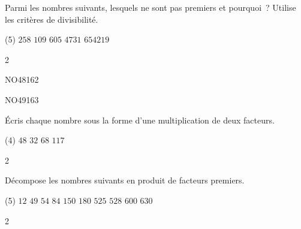 \documentclass[a4paper,12pt]{report}
\begin{document}
\begin{exo}{ %
    Parmi les nombres suivants, lesquels ne sont pas premiers et pourquoi~? Utilise les critères de divisibilité.
    \begin{tasks}[label-width = 1em ,item-indent = 2em ,before-skip = -0.4em, after-skip = -0.4em , label-offset=0.666em,after-item-skip = 0.3em](5)
    \task $258$
    \task $109$
    \task $605$
    \task $4731$
    \task $654219$
\end{tasks}
}{2}\end{exo}







\begin{exof}{NO48}{16}{2}
\end{exof}
\begin{exof}{NO49}{16}{3}
\end{exof}


\begin{exo}{ %
    Écris chaque nombre sous la forme d'une multiplication de deux facteurs.
    \begin{tasks}[label-width = 1em ,item-indent = 2em ,before-skip = -0.4em, after-skip = -0.4em , label-offset=0.666em,after-item-skip = 0.3em](4)
    \task $48$
    \task $32$
    \task $68$
    \task $117$
\end{tasks}
}{2}\end{exo}








\begin{exo}{
    Décompose les nombres suivants en produit de facteurs premiers.
    \begin{tasks}[label-width = 1em ,item-indent = 2em ,before-skip = -0.4em, after-skip = -0.4em , label-offset=0.666em,after-item-skip = 0.3em](5)
    \task $12$
    \task $49$
    \task $54$
    \task $84$
    \task $150$
    \task $180$
    \task $525$
    \task $528$
    \task $600$
    \task $630$
    \end{tasks}
}{2}\end{exo}
\end{document}
